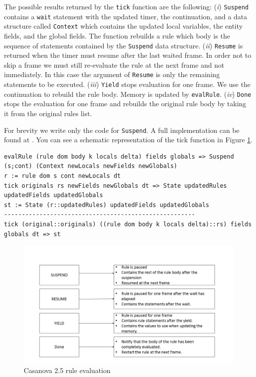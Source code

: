 The possible results returned by the \texttt{tick} function are the following: (\textit{i}) \texttt{Suspend} contains a \texttt{wait} statement with the updated timer, the continuation, and a data structure called \texttt{Context} which contains the updated local variables, the entity fields, and the global fields. The function rebuilds a rule which body is the sequence of statements contained by the \texttt{Suspend} data structure. (\textit{ii}) \texttt{Resume} is returned when the timer must resume after the last waited frame. In order not to skip a frame we must still re-evaluate the rule at the next frame and not immediately. In this case the argument of \texttt{Resume} is only the remaining statements to be executed. (\textit{iii}) \texttt{Yield} stops evaluation for one frame. We use the continuation to rebuild the rule body. Memory is updated by \texttt{evalRule}. (\textit{iv}) \texttt{Done} stops the evaluation for one frame and rebuilds the original rule body by taking it from the original rules list.

For brevity we write only the code for \texttt{Suspend}. A full implementation can be found at \cite{CASANOVA_SOURCE_CODE}. You can see a schematic representation of the tick function in Figure \ref{fig:tick}.

\begin{lstlisting}
evalRule (rule dom body k locals delta) fields globals => Suspend (s;cont) (Context newLocals newFields newGlobals)
r := rule dom s cont newLocals dt
tick originals rs newFields newGlobals dt => State updatedRules updatedFields updatedGlobals
st := State (r::updatedRules) updatedFields updatedGlobals
------------------------------------------------------
tick (original::originals) ((rule dom body k locals delta)::rs) fields globals dt => st
\end{lstlisting}


\begin{figure}
	\centering
	\includegraphics[scale = 0.25]{Pictures/tick2}
	\caption{Casanova 2.5 rule evaluation}
	\label{fig:tick}
\end{figure}

